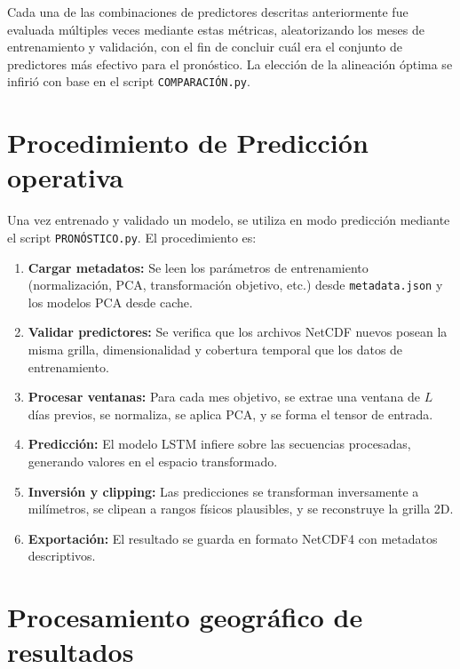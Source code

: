 Cada una de las combinaciones de predictores descritas anteriormente fue evaluada múltiples veces mediante estas métricas, aleatorizando los meses de entrenamiento y validación, con el fin de concluir cuál era el conjunto de predictores más efectivo para el pronóstico. La elección de la alineación óptima se infirió con base en el script \texttt{COMPARACIÓN.py}.

\section{Procedimiento de Predicción operativa}
\label{sec:prediccion_operativa}

Una vez entrenado y validado un modelo, se utiliza en modo predicción mediante el script \texttt{PRONÓSTICO.py}. El procedimiento es:

\begin{enumerate}
    \item \textbf{Cargar metadatos:} Se leen los parámetros de entrenamiento (normalización, PCA, transformación objetivo, etc.) desde \texttt{metadata.json} y los modelos PCA desde cache.
    \item \textbf{Validar predictores:} Se verifica que los archivos NetCDF nuevos posean la misma grilla, dimensionalidad y cobertura temporal que los datos de entrenamiento.
    \item \textbf{Procesar ventanas:} Para cada mes objetivo, se extrae una ventana de $L$ días previos, se normaliza, se aplica PCA, y se forma el tensor de entrada.
    \item \textbf{Predicción:} El modelo LSTM infiere sobre las secuencias procesadas, generando valores en el espacio transformado.
    \item \textbf{Inversión y clipping:} Las predicciones se transforman inversamente a milímetros, se clipean a rangos físicos plausibles, y se reconstruye la grilla 2D.
    \item \textbf{Exportación:} El resultado se guarda en formato NetCDF4 con metadatos descriptivos.
\end{enumerate}

\section{Procesamiento geográfico de resultados}
\label{sec:procesamiento_geografico}

